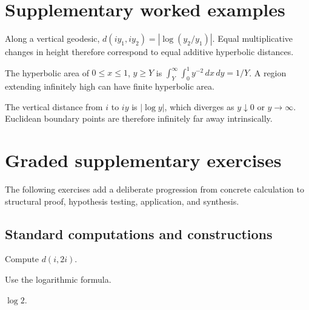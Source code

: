 \section{Supplementary worked examples}
\label{sec:vii32-pedagogy}

\begin{example}\label{ex:vii32-ped-01}
Along a vertical geodesic, \(d(iy_1,iy_2)=|\log(y_2/y_1)|\).  Equal multiplicative changes in height therefore correspond to equal additive hyperbolic distances.
\end{example}

\begin{example}\label{ex:vii32-ped-02}
The hyperbolic area of \(0\le x\le1\), \(y\ge Y\) is \(\int_Y^\infty\int_0^1 y^{-2}\,dx\,dy=1/Y\).  A region extending infinitely high can have finite hyperbolic area.
\end{example}

\begin{example}\label{ex:vii32-ped-03}
The vertical distance from \(i\) to \(iy\) is \(|\log y|\), which diverges as \(y\downarrow0\) or \(y\to\infty\).  Euclidean boundary points are therefore infinitely far away intrinsically.
\end{example}

\section{Graded supplementary exercises}
The following exercises add a deliberate progression from concrete calculation to structural proof, hypothesis testing, application, and synthesis.

\subsection*{Standard computations and constructions}

\begin{exercise}\label{exr:vii32-ped-01}
Compute \(d(i,2i)\).
\end{exercise}

\begin{hint}
Use the logarithmic formula.
\end{hint}

\begin{solution}
\(\log2\).
\end{solution}

